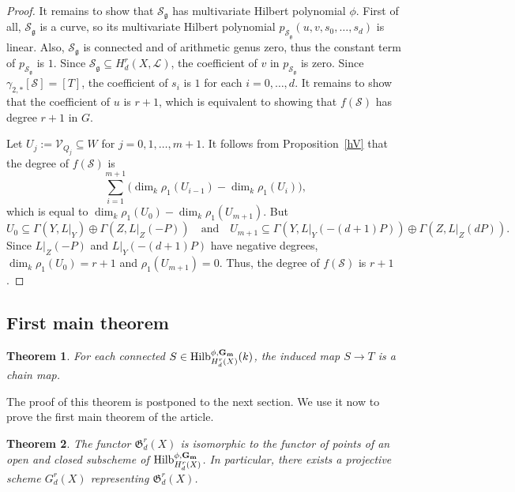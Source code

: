 \documentclass[a4paper,11pt]{amsart}
\theoremstyle{plain}
\newtheorem{thm}{Theorem}[section]
\theoremstyle{definition}
\theoremstyle{remark}
\def\cc{{\mathbf G}_{\mathbf m}}
\def\V{\mathcal{V}}
\begin{document}
\begin{proof}
It remains to show that $\mathcal S_{\mathfrak g}$ has multivariate Hilbert polynomial $\phi$. First of all, $\mathcal S_{\mathfrak g}$ is a curve, so its multivariate Hilbert polynomial $p_{\mathcal S_{\mathfrak g}}(u,v,s_0,\dots,s_d)$ is linear. Also, $\mathcal S_{\mathfrak g}$ is connected and of arithmetic genus zero, thus the constant term of $p_{\mathcal S_{\mathfrak g}}$ is $1$. Since 
$\mathcal S_{\mathfrak g}\subseteq H^r_d(X,\mathcal L)$, the coefficient of $v$ in $p_{\mathcal S_{\mathfrak g}}$ is zero. Since $\gamma_{2,*}[\mathcal S]=[T]$, the coefficient of $s_i$ is $1$ for each $i=0,\dots,d$. It remains to show that the coefficient of $u$ is $r+1$, which is equivalent to showing that $f(\mathcal S)$ has degree $r+1$ in $G$.

Let $U_j:=\V_{Q_j}\subseteq W$ for $j=0,1,\dots,m+1$. It follows from Proposition~\ref{hV} that the degree of $f(\mathcal S)$ is 
$$
\sum_{i=1}^{m+1}\Big(\dim_k\rho_1(U_{i-1})-\dim_k\rho_1(U_{i})\Big),
$$
which is equal to $\dim_k\rho_1(U_0)-\dim_k\rho_1(U_{m+1})$.
But 
$$
U_0\subseteq\Gamma(Y,L|_Y)\oplus\Gamma(Z,L|_Z(-P))\quad\text{and}\quad
U_{m+1}\subseteq\Gamma(Y,L|_Y(-(d+1)P))\oplus\Gamma(Z,L|_Z(dP)).
$$
Since $L|_Z(-P)$ and $L|_Y(-(d+1)P)$ have negative degrees, $\dim_k\rho_1(U_0)=r+1$ and $\rho_1(U_{m+1})=0$. 
Thus, the degree of $f(\mathcal S)$ is $r+1$. 
\end{proof}

\subsection{First main theorem}

\begin{thm}\label{chainmaps} For each connected $S\in \text{\rm Hilb}^{\phi,\cc}_{H^r_d(X)}(k)$, the induced map $S\to T$ is a chain map.
\end{thm}

The proof of this theorem is postponed to the next section. We use it now to prove the first main theorem of the article.

\begin{thm}\label{funct-equiv}
The functor $\mathfrak{G}_d^r(X)$ is isomorphic to the functor of points of an open and closed subscheme of $\text{\rm Hilb}_{H_d^r(X)}^{\phi,\cc}$. In particular, there exists a projective scheme $G_d^r(X)$ representing $\mathfrak{G}_d^r(X)$.
\end{thm}
\end{document}

